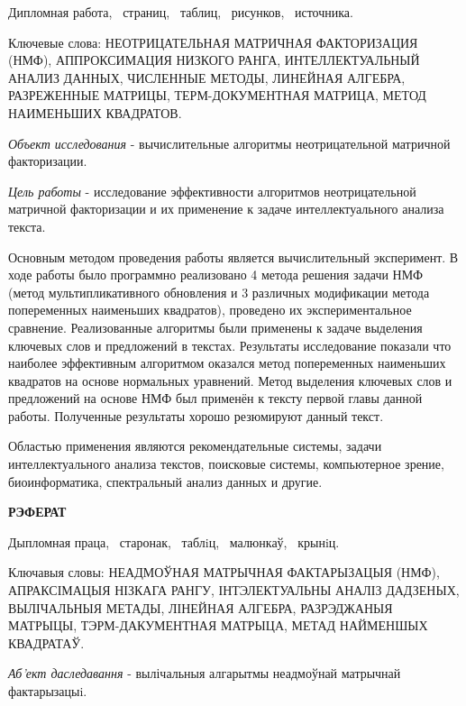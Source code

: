 Дипломная работа, \npages\ страниц, \ntables\ таблиц, \nris\ рисунков, \ncite\ источника.

Ключевые слова:
НЕОТРИЦАТЕЛЬНАЯ МАТРИЧНАЯ ФАКТОРИЗАЦИЯ (НМФ),
АППРОКСИМАЦИЯ НИЗКОГО РАНГА,
ИНТЕЛЛЕКТУАЛЬНЫЙ АНАЛИЗ ДАННЫХ,
ЧИСЛЕННЫЕ МЕТОДЫ, ЛИНЕЙНАЯ АЛГЕБРА,
РАЗРЕЖЕННЫЕ МАТРИЦЫ,
ТЕРМ-ДОКУМЕНТНАЯ МАТРИЦА,
МЕТОД НАИМЕНЬШИХ КВАДРАТОВ.

\textit{Объект исследования} - вычислительные алгоритмы неотрицательной матричной факторизации.


\textit{Цель работы} - исследование эффективности алгоритмов неотрицательной матричной факторизации и их применение к задаче интеллектуального анализа текста.

Основным методом проведения работы является вычислительный эксперимент. В ходе работы было программно реализовано 4 метода решения задачи НМФ
(метод мультипликативного обновления и 3 различных модификации метода попеременных наименьших квадратов), проведено их экспериментальное сравнение.
Реализованные алгоритмы были применены к задаче выделения ключевых слов и предложений в текстах.
Результаты исследование показали что наиболее эффективным алгоритмом оказался метод попеременных наименьших квадратов на основе нормальных уравнений.
Метод выделения ключевых слов и предложений на основе НМФ был применён к тексту первой главы данной работы.
Полученные результаты хорошо резюмируют данный текст.

Областью применения являются рекомендательные системы, задачи интеллектуального анализа текстов, поисковые системы, компьютерное зрение,
биоинформатика, спектральный анализ данных и другие.


\newpage


\begin{center}
  \fontsize{16pt}{0em}\textbf{РЭФЕРАТ}
\end{center}

Дыпломная праца, \npages\ старонак, \ntables\ таблiц, \nris\ малюнкаў, \ncite\ крынiц.

Ключавыя словы:
НЕАДМОЎНАЯ МАТРЫЧНАЯ ФАКТАРЫЗАЦЫЯ (НМФ),
АПРАКСІМАЦЫЯ НІЗКАГА РАНГУ,
ІНТЭЛЕКТУАЛЬНЫ АНАЛІЗ ДАДЗЕНЫХ,
ВЫЛІЧАЛЬНЫЯ МЕТАДЫ, ЛІНЕЙНАЯ АЛГЕБРА,
РАЗРЭДЖАНЫЯ МАТРЫЦЫ,
ТЭРМ-ДАКУМЕНТНАЯ МАТРЫЦА,
МЕТАД НАЙМЕНШЫХ КВАДРАТАЎ.

\textit{Аб'ект даследавання} - вылічальныя алгарытмы неадмоўнай матрычнай фактарызацыi.

